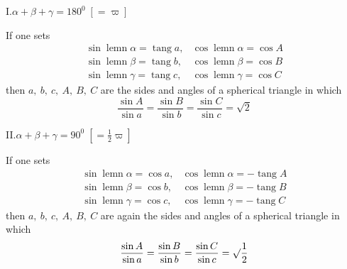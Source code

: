 \noindent I.\hfill $\alpha+\beta+\gamma=180^0\;[=\varpi]$\hfill\mbox{}

If one sets
\[
\begin{array}{ll}
\sin\operatorname{lemn}\alpha=\operatorname{tang}a,&\cos\operatorname{lemn}\alpha=\cos A\\[5pt]
\sin\operatorname{lemn}\beta=\operatorname{tang}b,&\cos\operatorname{lemn}\beta=\cos B\\[5pt]
\sin\operatorname{lemn}\gamma=\operatorname{tang}c,&\cos\operatorname{lemn}\gamma=\cos C
\end{array}
\]
then $a,\ b,\ c,\ A,\ B,\ C$ are the sides and angles of a spherical triangle in which
\[
\dfrac{\sin A}{\sin a}=\dfrac{\sin B}{\sin b}=\dfrac{\sin C}{\sin c}=\surd2
\]

\par{}\noindent II.\hfill $\alpha+\beta+\gamma=90^0\;[=\tfrac12\varpi]$\hfill\mbox{}

If one sets
\[
\begin{array}{ll}
\sin\operatorname{lemn}\alpha=\cos a,&\cos\operatorname{lemn}\alpha=-\operatorname{tang}A\\[5pt]
\sin\operatorname{lemn}\beta=\cos b,&\cos\operatorname{lemn}\beta=-\operatorname{tang}B\\[5pt]
\sin\operatorname{lemn}\gamma=\cos c,&\cos\operatorname{lemn}\gamma=-\operatorname{tang}C
\end{array}
\]
then $a,\ b,\ c,\ A,\ B,\ C$ are again the sides and angles of a spherical triangle in which
\[
\dfrac{\sin A}{\sin a}=\dfrac{\sin B}{\sin b}=\dfrac{\sin C}{\sin c}=\surd\dfrac12
\]

\clearpage
\endgroup
